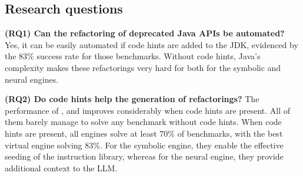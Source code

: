 \documentclass[sigconf,review,anonymous]{acmart}
\begin{document}


\subsection{Research questions}

{\bf (RQ1) Can the refactoring of deprecated Java APIs be automated?}
%
Yes, it can be easily automated if code hints are added to the JDK,
evidenced by the 83\% success rate for those benchmarks.  Without code
hints, Java's complexity makes these refactorings very hard for both for the
symbolic and neural engines.

\noindent
{\bf (RQ2) Do code hints help the generation of refactorings?}
%
The performance of \tool, \llma and \llmb improves considerably when code
hints are present.  All of them barely manage to solve any benchmark without
code hints.  When code hints are present, all engines solve at least 70\% of
benchmarks, with the best virtual engine solving 83\%.  For the symbolic
engine, they enable the effective seeding of the instruction library,
whereas for the neural engine, they provide additional context to the LLM.
\end{document}
